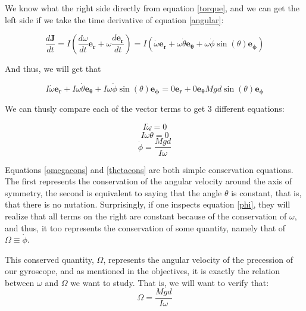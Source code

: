 \documentclass[a4paper,12pt]{article}
\begin{document}
We know what the right side directly from equation \eqref{torque}, and we can get the left side if we take the time derivative of equation \eqref{angular}:

$$\frac{d \boldsymbol{J}}{dt} = I \left(\frac{d\omega}{dt} \boldsymbol{e_r} + \omega \frac{d\boldsymbol{e_r}}{dt}\right) = I \left(\dot{\omega} \boldsymbol{e_r} + \omega\dot{\theta} \boldsymbol{e_\theta} + \omega \dot{\phi} \sin(\theta) \boldsymbol{e_\phi}  \right)$$ 

And thus, we will get that 

\begin{equation}
	 I \dot{\omega} \boldsymbol{e_r} + I\omega\dot{\theta} \boldsymbol{e_\theta} + I\omega \dot{\phi} \sin(\theta) \boldsymbol{e_\phi} = 0 \boldsymbol{e_r} + 0 \boldsymbol{e_\theta} M g d \sin(\theta) \boldsymbol{e_{\phi}}
\end{equation}

We can thusly compare each of the vector terms to get 3 different equations:

\begin{equation}
	\label{omegacons}
	I \dot{\omega} = 0
\end{equation}
\begin{equation}
	\label{thetacons}
	I \omega \dot{\theta} = 0
\end{equation}
\begin{equation}
	\label{phi}
	\dot{\phi} = \frac{M g d}{I\omega}
\end{equation}


Equations \eqref{omegacons} and \eqref{thetacons} are both simple conservation equations. The first represents the conservation of the angular velocity around the axis of symmetry, the second is equivalent to saying that the angle $\theta$ is constant, that is, that there is no nutation. Surprisingly, if one inspects equation \eqref{phi}, they will realize that all terms on the right are constant because of the conservation of $\omega$, and thus, it too represents the conservation of some quantity, namely that of $\Omega \equiv \dot{\phi}$. 

This conserved quantity, $\Omega$, represents the angular velocity of the precession of our gyroscope, and as mentioned in the objectives, it is exactly the relation between $\omega$ and $\Omega$ we want to study. That is, we will want to verify that:
\begin{equation}
  \label{Omegaomega}
 	\Omega = \frac{M g d}{I \omega}
 \end{equation} 
\end{document}
